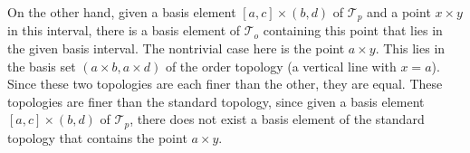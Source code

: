 \documentclass[12pt,letterpaper]{article}
\newcommand{\n}{\break}
\newcommand{\T}{\ensuremath{\mathcal{T}}}
\begin{document}
\begin{enumerate}
  On the other hand, given a basis element $[a,c]\times (b,d)$ of $\T_p$ and a point $x \times y$ in this interval, there is a basis element of $\T_o$ containing this point that lies in the given basis interval. The nontrivial case here is the point $a \times y$. This lies in the basis set $(a\times b, a\times d)$ of the order topology (a vertical line with $x=a$).
  Since these two topologies are each finer than the other, they are equal. \n
  These topologies are finer than the standard topology, since given a basis element $[a,c]\times (b,d)$ of $\T_p$, there does not exist a basis element of the standard topology that contains the point $a\times y$.
\end{enumerate}
\end{document}
